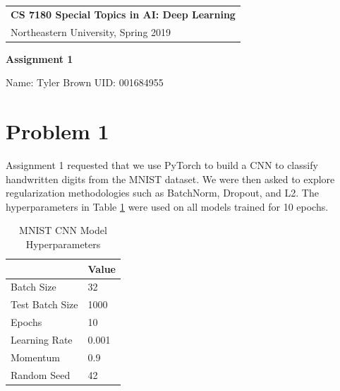 \documentclass[a4paper,12pt]{article} %
\begin{document}
\thispagestyle{empty} %

\begin{tabular}{p{15.5cm}} %
{\large \bf CS 7180 Special Topics in AI: Deep Learning} \\
Northeastern University, Spring 2019 \\
\hline %
\end{tabular} %

\vspace*{0.3cm} %

\begin{center} %
    {\Large \bf Assignment 1} %
    \vspace{2mm}
    
    {Name: Tyler Brown UID: 001684955}
\end{center} 
%
\vspace{0.2cm}

\section{Problem 1}

Assignment 1 requested that we use PyTorch to build a CNN to classify
handwritten digits from the MNIST dataset. We were then asked to explore
regularization methodologies such as BatchNorm, Dropout, and L2. The
hyperparameters in Table \ref{table:hyperparams} were used on all models
trained for 10 epochs.

\begin{table}[ht]
\centering
\caption{MNIST CNN Model Hyperparameters}
\label{table:hyperparams}
\begin{tabular}[t]{ll}
\toprule
&Value\\
\midrule
Batch Size & 32 \\
Test Batch Size & 1000 \\
Epochs & 10 \\
Learning Rate & 0.001 \\
Momentum & 0.9 \\
Random Seed & 42 \\
\bottomrule
\end{tabular}
\end{table}
\end{document}
